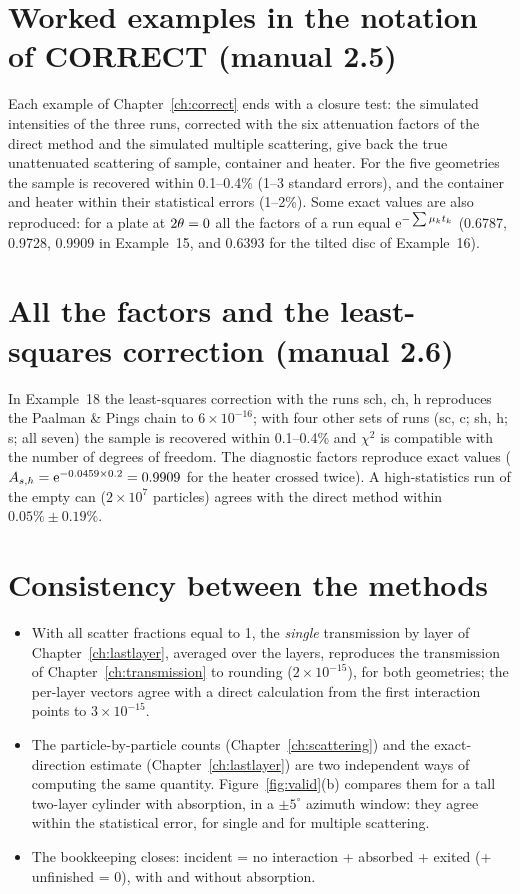 \section{Worked examples in the notation of CORRECT (manual 2.5)}

Each example of Chapter~\ref{ch:correct} ends with a closure test: the simulated intensities of the three runs, corrected with the six
attenuation factors of the direct method and the simulated multiple scattering, give back the true unattenuated scattering of sample,
container and heater. For the five geometries the sample is recovered within 0.1--0.4\% (1--3 standard errors), and the container and
heater within their statistical errors (1--2\%). Some exact values are also reproduced: for a plate at $2\theta=0$ all the factors of
a run equal $\operatorname{e}^{-\sum\mu_k t_k}$ (0.6787, 0.9728, 0.9909 in Example~15, and 0.6393 for the tilted disc of Example~16).

\section{All the factors and the least-squares correction (manual 2.6)}

In Example~18 the least-squares correction with the runs sch, ch, h reproduces the Paalman \& Pings chain to $6\times10^{-16}$; with four
other sets of runs (sc, c; sh, h; s; all seven) the sample is recovered within 0.1--0.4\% and $\chi^2$ is compatible with the number of
degrees of freedom. The diagnostic factors reproduce exact values ($A_{s,h} = \operatorname{e}^{-0.0459\times0.2} = 0.9909$ for the heater crossed
twice). A high-statistics run of the empty can ($2\times10^7$ particles) agrees with the direct method within $0.05\% \pm 0.19\%$.

\section{Consistency between the methods}

\begin{itemize}
  \item With all scatter fractions equal to 1, the \emph{single} transmission by layer of Chapter~\ref{ch:lastlayer}, averaged over the layers, reproduces the transmission of
        Chapter~\ref{ch:transmission} to rounding ($2\times10^{-15}$), for both geometries; the per-layer vectors agree with a direct calculation from the first
        interaction points to $3\times10^{-15}$.
  \item The particle-by-particle counts (Chapter~\ref{ch:scattering}) and the exact-direction estimate (Chapter~\ref{ch:lastlayer}) are two independent ways of
        computing the same quantity. Figure~\ref{fig:valid}(b) compares them for a tall two-layer cylinder with absorption, in a $\pm5^\circ$ azimuth window:
        they agree within the statistical error, for single and for multiple scattering.
  \item The bookkeeping closes: incident = no interaction + absorbed + exited (+ unfinished = 0), with and without absorption.
\end{itemize}


